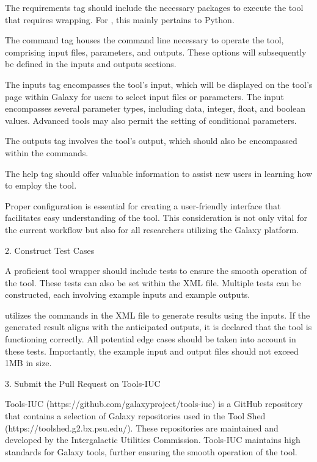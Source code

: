             The requirements tag should include the necessary packages to execute the tool that requires wrapping. For , this mainly pertains to Python.
            
            The command tag houses the command line necessary to operate the tool, comprising input files, parameters, and outputs. These options will subsequently be defined in the inputs and outputs sections.
            
            The inputs tag encompasses the tool's input, which will be displayed on the tool's page within Galaxy for users to select input files or parameters. The input encompasses several parameter types, including data, integer, float, and boolean values. Advanced tools may also permit the setting of conditional parameters.
            
            The outputs tag involves the tool's output, which should also be encompassed within the commands.
            
            The help tag should offer valuable information to assist new users in learning how to employ the tool.

            Proper configuration is essential for creating a user-friendly interface that facilitates easy understanding of the tool. This consideration is not only vital for the current workflow but also for all researchers utilizing the Galaxy platform.
            
            2. Construct Test Cases
            
            A proficient tool wrapper should include tests to ensure the smooth operation of the tool. These tests can also be set within the XML file. Multiple tests can be constructed, each involving example inputs and example outputs. 
            
             utilizes the commands in the XML file to generate results using the inputs. If the generated result aligns with the anticipated outputs, it is declared that the tool is functioning correctly. All potential edge cases should be taken into account in these tests. Importantly, the example input and output files should not exceed 1MB in size.
            
            3. Submit the Pull Request on Tools-IUC
            
            Tools-IUC (https://github.com/galaxyproject/tools-iuc) is a GitHub repository that contains a selection of Galaxy repositories used in the Tool Shed (https://toolshed.g2.bx.psu.edu/). These repositories are maintained and developed by the Intergalactic Utilities Commission. Tools-IUC maintains high standards for Galaxy tools, further ensuring the smooth operation of the tool.
            
